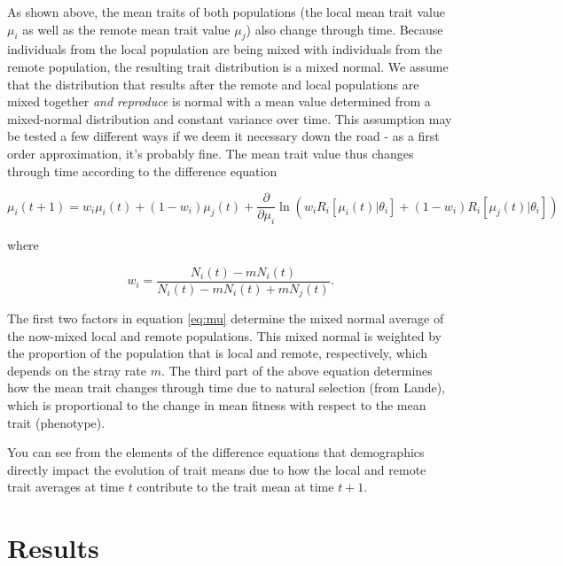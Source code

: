 \documentclass[onecolumn,preprintnumbers,amsmath,amssymb,superscriptaddress]{revtex4}
\begin{document}
As shown above, the mean traits of both populations (the local mean trait value $\mu_i$ as well as the remote mean trait value $\mu_j$) also change through time.
Because individuals from the local population are being mixed with individuals from the remote population, the resulting trait distribution is a mixed normal.
We assume that the distribution that results after the remote and local populations are mixed together \emph{and reproduce} is normal with a mean value determined from a mixed-normal distribution and constant variance over time.
This assumption may be tested a few different ways if we deem it necessary down the road - as a first order approximation, it's probably fine.
The mean trait value thus changes through time according to the difference equation

\begin{equation}
  \mu_i(t+1) = w_i\mu_i(t) + (1-w_i)\mu_j(t) + \frac{\partial}{\partial \mu_i}\ln\left(w_i R_i[\mu_i(t)|\theta_i] + (1-w_i)R_i[\mu_j(t)|\theta_i]  \right)
  \label{eq:mu}
\end{equation}

\noindent where

\begin{equation}
  w_i=\frac{N_i(t)-m N_i(t)}{N_i(t)-m N_i(t) + m N_j(t)}.
\end{equation}

The first two factors in equation \ref{eq:mu} determine the mixed normal average of the now-mixed local and remote populations.
This mixed normal is weighted by the proportion of the population that is local and remote, respectively, which depends on the stray rate $m$.
The third part of the above equation determines how the mean trait changes through time due to natural selection (from Lande), which is proportional to the change in mean fitness with respect to the mean trait (phenotype).

You can see from the elements of the difference equations that demographics directly impact the evolution of trait means due to how the local and remote trait averages at time $t$ contribute to the trait mean at time $t+1$.




\section*{Results}

\end{document}
